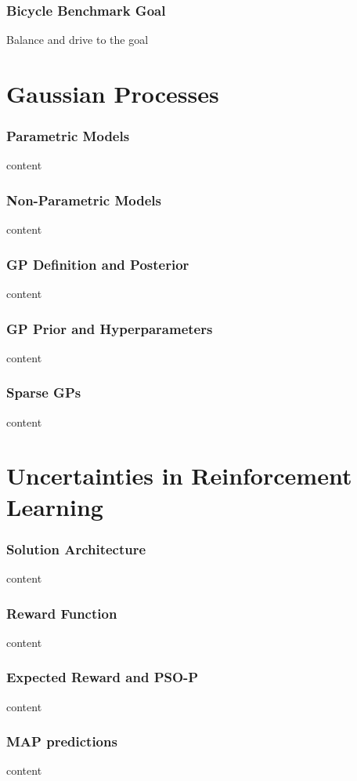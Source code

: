 \begin{frame}
    \frametitle{Bicycle Benchmark Goal}

    Balance and drive to the goal
\end{frame}

\section{Gaussian Processes}
\begin{frame}
    \frametitle{Parametric Models}

    content
\end{frame}

\begin{frame}
    \frametitle{Non-Parametric Models}

    content
\end{frame}

\begin{frame}
    \frametitle{GP Definition and Posterior}

    content
\end{frame}

\begin{frame}
    \frametitle{GP Prior and Hyperparameters}

    content
\end{frame}

\begin{frame}
    \frametitle{Sparse GPs}

    content
\end{frame}

\section{Uncertainties in Reinforcement Learning}
\begin{frame}
    \frametitle{Solution Architecture}

    content
\end{frame}

\begin{frame}
    \frametitle{Reward Function}

    content
\end{frame}

\begin{frame}
    \frametitle{Expected Reward and PSO-P}

    content
\end{frame}

\begin{frame}
    \frametitle{MAP predictions}

    content
\end{frame}

